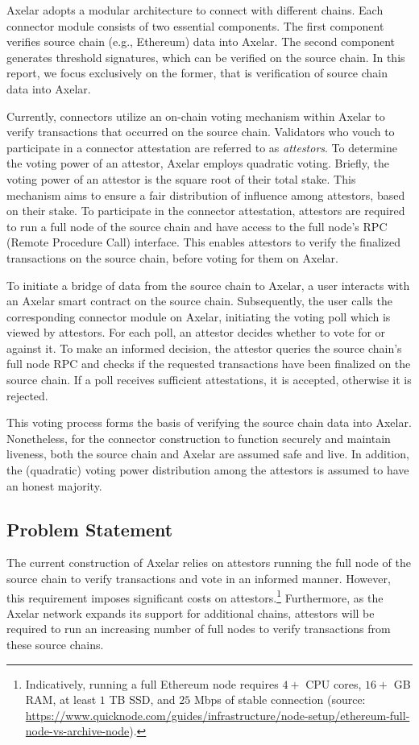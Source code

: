 Axelar adopts a modular architecture to connect with different chains. Each connector module consists of two essential components. The first component verifies source chain (e.g., Ethereum) data into Axelar. The second component generates threshold signatures, which can be verified on the source chain. In this report, we focus exclusively on the former, that is verification of source chain data into Axelar.

Currently, connectors utilize an on-chain voting mechanism within Axelar to verify transactions that occurred on the source chain. Validators who vouch to participate in a connector attestation are referred to as \emph{attestors}. To determine the voting power of an attestor, Axelar employs quadratic voting. Briefly, the voting power of an attestor is the square root of their total stake. This mechanism aims to ensure a fair distribution of influence among attestors, based on their stake. To participate in the connector attestation, attestors are required to run a full node of the source chain and have access to the full node's RPC (Remote Procedure Call) interface. This enables attestors to verify the finalized transactions on the source chain, before voting for them on Axelar.

To initiate a bridge of data from the source chain to Axelar, a user interacts with an Axelar smart contract on the source chain. Subsequently, the user calls the corresponding connector module on Axelar, initiating the voting poll which is viewed by attestors. For each poll, an attestor decides whether to vote for or against it. To make an informed decision, the attestor queries the source chain's full node RPC and checks if the requested
transactions have been finalized on the source chain. If a poll receives sufficient attestations, it is accepted, otherwise it is rejected.

This voting process forms the basis of verifying the source chain data into Axelar.
Nonetheless, for the connector construction to function securely and maintain liveness, both the source chain and Axelar are assumed safe and live. In addition, the (quadratic) voting power distribution among the attestors is assumed to have an honest majority.

\subsection{Problem Statement}
The current construction of Axelar relies on attestors running the full node of the source chain to verify transactions and vote in an informed manner. However, this requirement imposes significant costs on attestors.\footnote{Indicatively, running a full Ethereum node requires $4+$ CPU cores, $16+$ GB RAM, at least $1$ TB SSD, and $25$ Mbps of stable connection (source: \url{https://www.quicknode.com/guides/infrastructure/node-setup/ethereum-full-node-vs-archive-node}).}
Furthermore, as the Axelar network expands its support for additional chains, attestors will be required to run an increasing number of full nodes to verify transactions from these source chains.

